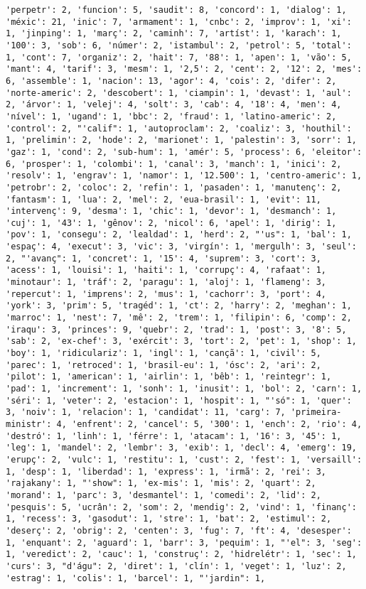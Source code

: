 \documentclass[11pt]{article}
\begin{document}
\begin{Verbatim}[commandchars=\\\{\}]
'perpetr': 2, 'funcion': 5, 'saudit': 8, 'concord': 1, 'dialog': 1, 'méxic': 21, 'inic': 7, 'armament': 1, 'cnbc': 2, 'improv': 1, 'xi': 1, 'jinping': 1, 'març': 2, 'caminh': 7, 'artíst': 1, 'karach': 1, '100': 3, 'sob': 6, 'númer': 2, 'istambul': 2, 'petrol': 5, 'total': 1, 'cont': 7, 'organiz': 2, 'hait': 7, '88': 1, 'apen': 1, 'vão': 5, 'mant': 4, 'tarif': 3, 'mesm': 1, '2,5': 2, 'cent': 2, '12': 2, 'mes': 6, 'assemble': 1, 'nacion': 13, 'agor': 4, 'cois': 2, 'difer': 2, 'norte-americ': 2, 'descobert': 1, 'ciampin': 1, 'devast': 1, 'aul': 2, 'árvor': 1, 'velej': 4, 'solt': 3, 'cab': 4, '18': 4, 'men': 4, 'nível': 1, 'ugand': 1, 'bbc': 2, 'fraud': 1, 'latino-americ': 2, 'control': 2, "'calif": 1, 'autoproclam': 2, 'coaliz': 3, 'houthil': 1, 'prelimin': 2, 'hode': 2, 'marionet': 1, 'palestin': 3, 'sorr': 1, 'gaz': 1, 'cond': 2, 'sub-hum': 1, 'amér': 5, 'process': 6, 'eleitor': 6, 'prosper': 1, 'colombi': 1, 'canal': 3, 'manch': 1, 'inici': 2, 'resolv': 1, 'engrav': 1, 'namor': 1, '12.500': 1, 'centro-americ': 1, 'petrobr': 2, 'coloc': 2, 'refin': 1, 'pasaden': 1, 'manutenç': 2, 'fantasm': 1, 'lua': 2, 'mel': 2, 'eua-brasil': 1, 'evit': 11, 'intervenç': 9, 'desma': 1, 'chic': 1, 'devor': 1, 'desmanch': 1, 'cuj': 1, '43': 1, 'gênov': 2, 'nicol': 6, 'apel': 1, 'dirig': 1, 'pov': 1, 'consegu': 2, 'lealdad': 1, 'herd': 2, "'us": 1, 'bal': 1, 'espaç': 4, 'execut': 3, 'vic': 3, 'virgín': 1, 'mergulh': 3, 'seul': 2, "'avanç": 1, 'concret': 1, '15': 4, 'suprem': 3, 'cort': 3, 'acess': 1, 'louisi': 1, 'haiti': 1, 'corrupç': 4, 'rafaat': 1, 'minotaur': 1, 'tráf': 2, 'paragu': 1, 'aloj': 1, 'flameng': 3, 'repercut': 1, 'imprens': 2, 'mus': 1, 'cachorr': 3, 'port': 4, 'york': 3, 'prim': 5, 'tragéd': 1, 'ct': 2, 'harry': 2, 'meghan': 1, 'marroc': 1, 'nest': 7, 'mê': 2, 'trem': 1, 'filipin': 6, 'comp': 2, 'iraqu': 3, 'princes': 9, 'quebr': 2, 'trad': 1, 'post': 3, '8': 5, 'sab': 2, 'ex-chef': 3, 'exércit': 3, 'tort': 2, 'pet': 1, 'shop': 1, 'boy': 1, 'ridiculariz': 1, 'ingl': 1, 'cançã': 1, 'civil': 5, 'parec': 1, 'retroced': 1, 'brasil-eu': 1, 'ósc': 2, 'ari': 2, 'pilot': 1, 'american': 1, 'airlin': 1, 'bêb': 1, 'reintegr': 1, 'pad': 1, 'increment': 1, 'sonh': 1, 'inusit': 1, 'bol': 2, 'carn': 1, 'séri': 1, 'veter': 2, 'estacion': 1, 'hospit': 1, "'só": 1, 'quer': 3, 'noiv': 1, 'relacion': 1, 'candidat': 11, 'carg': 7, 'primeira-ministr': 4, 'enfrent': 2, 'cancel': 5, '300': 1, 'ench': 2, 'rio': 4, 'destró': 1, 'linh': 1, 'férre': 1, 'atacam': 1, '16': 3, '45': 1, 'leg': 1, 'mandel': 2, 'lembr': 3, 'exib': 1, 'decl': 4, 'emerg': 19, 'erupç': 2, 'vulc': 1, 'restitu': 1, 'cust': 2, 'fest': 1, 'versaill': 1, 'desp': 1, 'liberdad': 1, 'express': 1, 'irmã': 2, 'rei': 3, 'rajakany': 1, "'show": 1, 'ex-mis': 1, 'mis': 2, 'quart': 2, 'morand': 1, 'parc': 3, 'desmantel': 1, 'comedi': 2, 'lid': 2, 'pesquis': 5, 'ucrân': 2, 'som': 2, 'mendig': 2, 'vind': 1, 'finanç': 1, 'recess': 3, 'gasodut': 1, 'stre': 1, 'bat': 2, 'estimul': 2, 'deserç': 2, 'obrig': 2, 'centen': 3, 'fug': 7, 'ft': 4, 'desesper': 1, 'enquant': 2, 'aguard': 1, 'barr': 3, 'pequim': 1, "'el": 3, 'seg': 1, 'veredict': 2, 'cauc': 1, 'construç': 2, 'hidrelétr': 1, 'sec': 1, 'curs': 3, "d'águ": 2, 'diret': 1, 'clín': 1, 'veget': 1, 'luz': 2, 'estrag': 1, 'colis': 1, 'barcel': 1, "'jardin": 1, 
\end{Verbatim}
\end{document}
